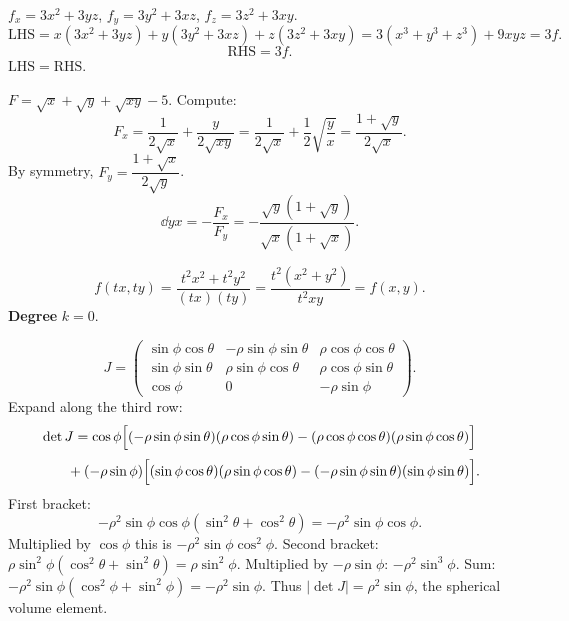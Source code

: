 \begin{solutions}
  \item $f_{x}=3x^{2}+3yz$, $f_{y}=3y^{2}+3xz$, $f_{z}=3z^{2}+3xy$.
        \[
          \mathrm{LHS}=x(3x^{2}+3yz)+y(3y^{2}+3xz)+z(3z^{2}+3xy)
            =3(x^{3}+y^{3}+z^{3})+9xyz=3f .
        \]
        \[
          \mathrm{RHS}=3f .
        \]
        $\mathrm{LHS}=\mathrm{RHS}$. \checkmark

  \item $F=\sqrt{x}+\sqrt{y}+\sqrt{xy}-5$. Compute:
        \[
          F_{x}=\frac{1}{2\sqrt{x}}+\frac{y}{2\sqrt{xy}}
            =\frac{1}{2\sqrt{x}}+\frac{1}{2}\sqrt{\frac{y}{x}}
            =\frac{1+\sqrt{y}}{2\sqrt{x}} .
        \]
        By symmetry, $F_{y}=\dfrac{1+\sqrt{x}}{2\sqrt{y}}$.
        \[
          \dd{y}{x} = -\frac{F_{x}}{F_{y}}
            = -\frac{\sqrt{y}(1+\sqrt{y})}{\sqrt{x}(1+\sqrt{x})} .
        \]

  \item
        \[
          f(tx,ty)=\frac{t^{2}x^{2}+t^{2}y^{2}}{(tx)(ty)}
            =\frac{t^{2}(x^{2}+y^{2})}{t^{2}xy}=f(x,y) .
        \]
        \textbf{Degree} $k=0$.

  \item
        \[
          J=\begin{pmatrix}
            \sin\phi\cos\theta & -\rho\sin\phi\sin\theta & \rho\cos\phi\cos\theta\\
            \sin\phi\sin\theta & \rho\sin\phi\cos\theta & \rho\cos\phi\sin\theta\\
            \cos\phi & 0 & -\rho\sin\phi
          \end{pmatrix} .
        \]
        Expand along the third row:
        \[
          \det J = \cos\phi\Bigl[(-\rho\sin\phi\sin\theta)(\rho\cos\phi\sin\theta)
            -(\rho\cos\phi\cos\theta)(\rho\sin\phi\cos\theta)\Bigr]
        \]
        \[
          \qquad{}+(-\rho\sin\phi)\Bigl[(\sin\phi\cos\theta)(\rho\sin\phi\cos\theta)
            -(-\rho\sin\phi\sin\theta)(\sin\phi\sin\theta)\Bigr] .
        \]
        First bracket:
        \[
          -\rho^{2}\sin\phi\cos\phi(\sin^{2}\theta+\cos^{2}\theta)
            =-\rho^{2}\sin\phi\cos\phi .
        \]
        Multiplied by $\cos\phi$ this is
        $-\rho^{2}\sin\phi\cos^{2}\phi$. Second bracket:
        $\rho\sin^{2}\phi(\cos^{2}\theta+\sin^{2}\theta)=\rho\sin^{2}\phi$.
        Multiplied by $-\rho\sin\phi$: $-\rho^{2}\sin^{3}\phi$. Sum:
        $-\rho^{2}\sin\phi(\cos^{2}\phi+\sin^{2}\phi)=-\rho^{2}\sin\phi$.
        Thus $|\det J|=\rho^{2}\sin\phi$, the spherical volume element.


\end{solutions}

